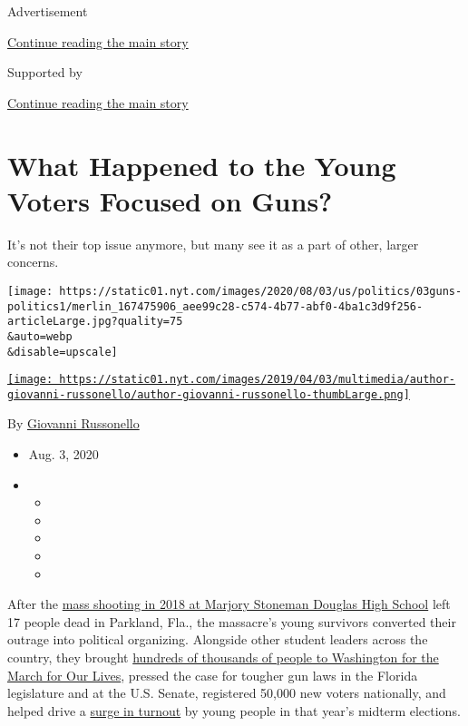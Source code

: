 Advertisement

\protect\hyperlink{after-top}{Continue reading the main story}

Supported by

\protect\hyperlink{after-sponsor}{Continue reading the main story}

\hypertarget{what-happened-to-the-young-voters-focused-on-guns}{%
\section{What Happened to the Young Voters Focused on
Guns?}\label{what-happened-to-the-young-voters-focused-on-guns}}

It's not their top issue anymore, but many see it as a part of other,
larger concerns.

\texttt{[image: https://static01.nyt.com/images/2020/08/03/us/politics/03guns-politics1/merlin\_167475906\_aee99c28-c574-4b77-abf0-4ba1c3d9f256-articleLarge.jpg?quality=75\\\&auto=webp\\\&disable=upscale]}

\href{https://www.nytimes.com/by/giovanni-russonello}{\texttt{[image: https://static01.nyt.com/images/2019/04/03/multimedia/author-giovanni-russonello/author-giovanni-russonello-thumbLarge.png]}}

By \href{https://www.nytimes.com/by/giovanni-russonello}{Giovanni
Russonello}

\begin{itemize}
\item
  Aug. 3, 2020
\item
  \begin{itemize}
  \item
  \item
  \item
  \item
  \item
  \end{itemize}
\end{itemize}

After the
\href{https://www.nytimes.com/2019/02/13/us/parkland-anniversary-marjory-stoneman-douglas.html}{mass
shooting in 2018 at Marjory Stoneman Douglas High School} left 17 people
dead in Parkland, Fla., the massacre's young survivors converted their
outrage into political organizing. Alongside other student leaders
across the country, they brought
\href{https://www.nytimes.com/2018/03/24/us/march-for-our-lives.html}{hundreds
of thousands of people to Washington for the March for Our Lives},
pressed the case for tougher gun laws in the Florida legislature and at
the U.S. Senate, registered 50,000 new voters nationally, and helped
drive a
\href{https://www.nytimes.com/2018/11/07/us/elections-gun-control-florida.html}{surge
in turnout} by young people in that year's midterm elections.

